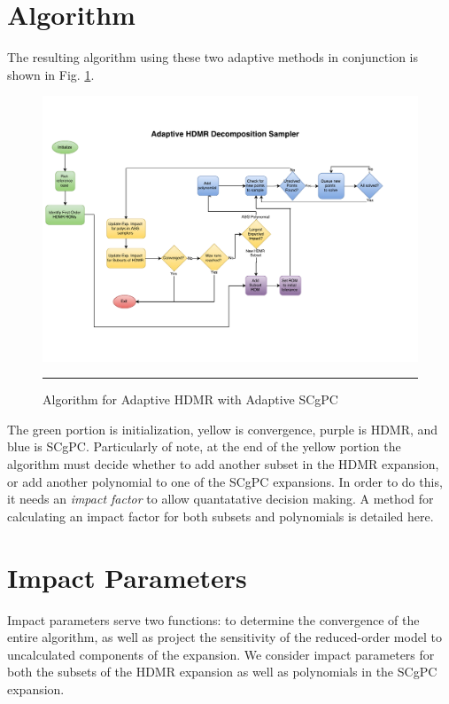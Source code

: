 \documentclass[11pt]{article}
\begin{document}
\section{Algorithm}
The resulting algorithm using these two adaptive methods in conjunction is shown in Fig. \ref{fig:flow}.
\begin{figure}[H]
  \centering
    \includegraphics[width=\linewidth]{../graphics/diagram-AHDMR.pdf}
    \rule{35em}{0.5pt}
  \caption{Algorithm for Adaptive HDMR with Adaptive SCgPC}
  \label{fig:flow}
\end{figure}
The green portion is initialization, yellow is convergence, purple is HDMR, and blue is SCgPC.  Particularly of note, at the end of the yellow portion the algorithm must decide whether to add another subset in the HDMR expansion, or add another polynomial to one of the SCgPC expansions.  In order to do this, it needs an \emph{impact factor} to allow quantatative decision making.  A method for calculating an impact factor for both subsets and polynomials is detailed here.

\section{Impact Parameters}
Impact parameters serve two functions: to determine the convergence of the entire algorithm, as well as project the sensitivity of the reduced-order model to uncalculated components of the expansion.  We consider impact parameters for both the subsets of the HDMR expansion as well as polynomials in the SCgPC expansion.
\end{document}
